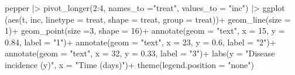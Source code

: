 \documentclass[
  letterpaper,
  DIV=11,
  numbers=noendperiod]{scrreprt}
\newenvironment{Shaded}{\begin{snugshade}}{\end{snugshade}}
\newcommand{\AttributeTok}[1]{\textcolor[rgb]{0.40,0.45,0.13}{#1}}
\newcommand{\DecValTok}[1]{\textcolor[rgb]{0.68,0.00,0.00}{#1}}
\newcommand{\FloatTok}[1]{\textcolor[rgb]{0.68,0.00,0.00}{#1}}
\newcommand{\FunctionTok}[1]{\textcolor[rgb]{0.28,0.35,0.67}{#1}}
\newcommand{\NormalTok}[1]{\textcolor[rgb]{0.00,0.23,0.31}{#1}}
\newcommand{\SpecialCharTok}[1]{\textcolor[rgb]{0.37,0.37,0.37}{#1}}
\newcommand{\StringTok}[1]{\textcolor[rgb]{0.13,0.47,0.30}{#1}}
\begin{document}
\begin{Shaded}
\begin{Highlighting}[]
\NormalTok{pepper }\SpecialCharTok{|\textgreater{}} 
  \FunctionTok{pivot\_longer}\NormalTok{(}\DecValTok{2}\SpecialCharTok{:}\DecValTok{4}\NormalTok{, }\AttributeTok{names\_to =}\StringTok{"treat"}\NormalTok{, }\AttributeTok{values\_to =} \StringTok{"inc"}\NormalTok{) }\SpecialCharTok{|\textgreater{}} 
  \FunctionTok{ggplot}\NormalTok{ (}\FunctionTok{aes}\NormalTok{(t, inc, }
              \AttributeTok{linetype =}\NormalTok{ treat, }
              \AttributeTok{shape =}\NormalTok{ treat, }
              \AttributeTok{group =}\NormalTok{ treat))}\SpecialCharTok{+}
  \FunctionTok{geom\_line}\NormalTok{(}\AttributeTok{size =} \DecValTok{1}\NormalTok{)}\SpecialCharTok{+}
  \FunctionTok{geom\_point}\NormalTok{(}\AttributeTok{size =}\DecValTok{3}\NormalTok{, }\AttributeTok{shape =} \DecValTok{16}\NormalTok{)}\SpecialCharTok{+}
  \FunctionTok{annotate}\NormalTok{(}\AttributeTok{geom =} \StringTok{"text"}\NormalTok{, }\AttributeTok{x =} \DecValTok{15}\NormalTok{, }\AttributeTok{y =} \FloatTok{0.84}\NormalTok{, }\AttributeTok{label =} \StringTok{"1"}\NormalTok{)}\SpecialCharTok{+}
  \FunctionTok{annotate}\NormalTok{(}\AttributeTok{geom =} \StringTok{"text"}\NormalTok{, }\AttributeTok{x =} \DecValTok{23}\NormalTok{, }\AttributeTok{y =} \FloatTok{0.6}\NormalTok{, }\AttributeTok{label =} \StringTok{"2"}\NormalTok{)}\SpecialCharTok{+}
  \FunctionTok{annotate}\NormalTok{(}\AttributeTok{geom =} \StringTok{"text"}\NormalTok{, }\AttributeTok{x =} \DecValTok{32}\NormalTok{, }\AttributeTok{y =} \FloatTok{0.33}\NormalTok{, }\AttributeTok{label =} \StringTok{"3"}\NormalTok{)}\SpecialCharTok{+}
  \FunctionTok{labs}\NormalTok{(}\AttributeTok{y =} \StringTok{"Disease incidence (y)"}\NormalTok{,}
       \AttributeTok{x =} \StringTok{"Time (days)"}\NormalTok{)}\SpecialCharTok{+}
  \FunctionTok{theme}\NormalTok{(}\AttributeTok{legend.position =} \StringTok{"none"}\NormalTok{)}
\end{Highlighting}
\end{Shaded}
\end{document}
